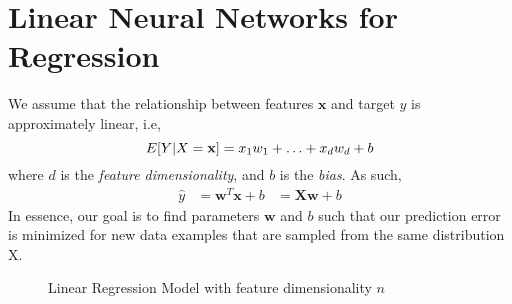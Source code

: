 \documentclass[a4paper,12pt]{article}
\theoremstyle{definition}
\begin{document}
\section{Linear Neural Networks for Regression}
    We assume that the relationship between features $\mathbf{x}$ and target $y$ is approximately linear, i.e,
    \begin{equation}
        E[Y|X=\mathbf{x}] = x_1w_1 + \ldots + x_dw_d + b \\
    \end{equation}
    where $d$ is the \textit{feature dimensionality}, and $b$ is the \textit{bias}. As such,
    \begin{equation}
        \begin{aligned}
        \hat{y} &= \mathbf{w}^T\mathbf{x} + b
                &= \mathbf{Xw} + b
        \end{aligned}
    \end{equation}
    In essence, our goal is to find parameters $\mathbf{w}$ and $b$ such that our prediction error is 
    minimized for new data examples that are sampled from the same distribution X.
    \begin{figure}[h]
        \centering
        \caption{Linear Regression Model with feature dimensionality $n$}
    \end{figure}
\end{document}
